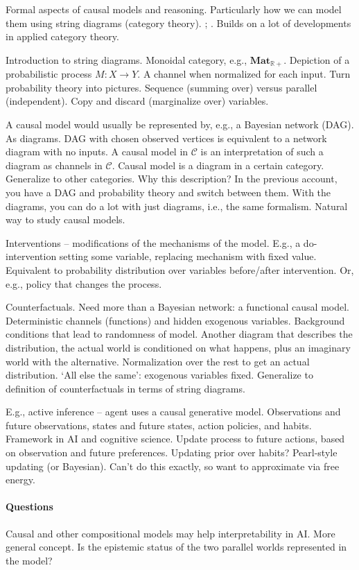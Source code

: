 
\begin{affils}
\end{affils}

Formal aspects of causal models and reasoning.
Particularly how we can model them using string diagrams (category theory).
 \parencites{Lorenz2023a};
 \parencites{Tull2023}.
Builds on a lot of developments in applied category theory.

Introduction to string diagrams.
Monoidal category, e.g., $\textbf{Mat}_{\mathbb{R}+}$.
Depiction of a probabilistic process $M : X \to Y$.
A channel when normalized for each input.
Turn probability theory into pictures.
Sequence (summing over) versus parallel (independent).
Copy and discard (marginalize over) variables.

A causal model would usually be represented by, e.g., a Bayesian network (DAG).
As diagrams.
DAG with chosen observed vertices is equivalent to a network diagram with no inputs.
A causal model in $\mathcal{C}$ is an interpretation of such a diagram as channels in
$\mathcal{C}$.
Causal model is a diagram in a certain category.
Generalize to other categories.
Why this description?
In the previous account, you have a DAG and probability theory and switch between them.
With the diagrams, you can do a lot with just diagrams, i.e., the same formalism.
Natural way to study causal models.

Interventions -- modifications of the mechanisms of the model.
E.g., a do-intervention setting some variable, replacing mechanism with fixed value.
Equivalent to probability distribution over variables before/after intervention.
Or, e.g., policy that changes the process.

Counterfactuals.
Need more than a Bayesian network: a functional causal model.
Deterministic channels (functions) and hidden exogenous variables.
Background conditions that lead to randomness of model.
Another diagram that describes the distribution, the actual world is conditioned on
what happens, plus an imaginary world with the alternative.
Normalization over the rest to get an actual distribution.
`All else the same': exogenous variables fixed.
Generalize to definition of counterfactuals in terms of string diagrams.

E.g., active inference -- agent uses a causal generative model.
Observations and future observations, states and future states, action policies, and
habits.
Framework in AI and cognitive science.
Update process to future actions, based on observation and future preferences.
Updating prior over habits?
Pearl-style updating (or Bayesian).
Can't do this exactly, so want to approximate via free energy.

\paragraph{Questions}

Causal and other compositional models may help interpretability in AI.
More general concept.
Is the epistemic status of the two parallel worlds represented in the model?

